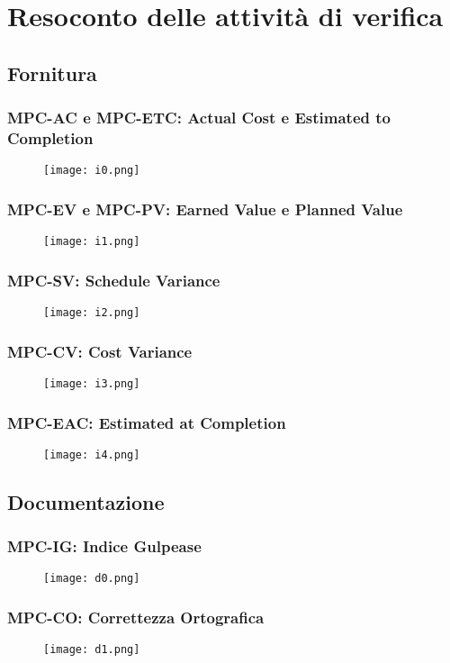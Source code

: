 \section{Resoconto delle attività di verifica}

\subsection{Fornitura}

\subsubsection{MPC-AC e MPC-ETC: Actual Cost e Estimated to Completion}
\begin{figure}[H] \texttt{[image: i0.png]} \end{figure}

\subsubsection{MPC-EV e MPC-PV: Earned Value e Planned Value}
\begin{figure}[H] \texttt{[image: i1.png]} \end{figure}

\subsubsection{MPC-SV: Schedule Variance}
\begin{figure}[H] \texttt{[image: i2.png]} \end{figure}

\subsubsection{MPC-CV: Cost Variance}
\begin{figure}[H] \texttt{[image: i3.png]} \end{figure}

\subsubsection{MPC-EAC: Estimated at Completion}
\begin{figure}[H] \texttt{[image: i4.png]} \end{figure}

\subsection{Documentazione}

\subsubsection{MPC-IG: Indice Gulpease}
\begin{figure}[H] \texttt{[image: d0.png]} \end{figure}

\subsubsection{MPC-CO: Correttezza Ortografica}
\begin{figure}[H] \texttt{[image: d1.png]} \end{figure}


